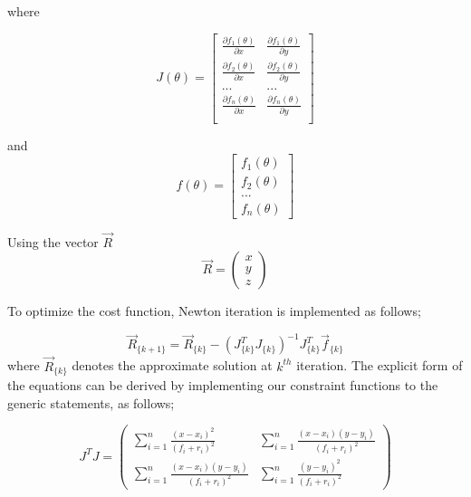 \documentclass[twoside]{article}
\begin{document}
\begin{multicols}{2}
where

\begin{equation}
J(\theta) = \begin{bmatrix}
  \frac{\partial{f_1(\theta)}}{\partial{x}} & \frac{\partial{f_1(\theta)}}{\partial{y}} \\
  \frac{\partial{f_2(\theta)}}{\partial{x}} & \frac{\partial{f_2(\theta)}}{\partial{y}} \\
  ... & ... \\
  \frac{\partial{f_n(\theta)}}{\partial{x}} & \frac{\partial{f_n(\theta)}}{\partial{y}} \\
\end{bmatrix}
\end{equation}

and 
\begin{equation}
 f(\theta) = \begin{bmatrix}
  f_1(\theta) \\
  f_2(\theta) \\
  ...         \\
  f_n(\theta)
 \end{bmatrix}
\end{equation}
	
Using the vector $\vec{R}$	
\begin{equation}
 \vec{R} = \left(\begin{matrix}
  x \\ y \\ z
 \end{matrix}\right)
\end{equation}

To optimize the cost function, Newton iteration is implemented as follows;

\begin{equation}
 \vec{R}_{\{k+1\}} =  \vec{R}_{\{k\}} - (J^T_{\{k\}}J_{\{k\}})^{-1}J^T_{\{k\}}\vec{f}_{\{k\}}
\end{equation}	
	where $\vec{R}_{\{k\}}$ denotes the approximate solution at $k^{th}$ iteration. The explicit form of the equations can be derived  by implementing our constraint functions to the generic statements, as follows;
	
\begin{equation}
  J^TJ = \left(\begin{matrix}
 \sum_{i=1}^{n} \frac{(x-x_i)^2}{(f_i+r_i)^2} &  \sum_{i=1}^{n} \frac{(x-x_i)(y-y_i)}{(f_i+r_i)^2} \\
  \sum_{i=1}^{n} \frac{(x-x_i)(y-y_i)}{(f_i+r_i)^2} &  \sum_{i=1}^{n} \frac{(y-y_i)^2}{(f_i+r_i)^2}
  \end{matrix}\right)
\end{equation}	


\end{multicols}
\end{document}

